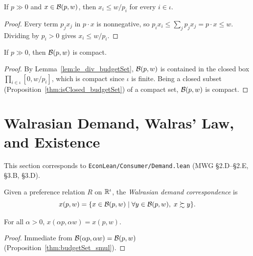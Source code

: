 \begin{lemma}
\label{lem:le_div_budgetSet}
\leanok
{}
If $p \gg 0$ and $x \in \mathcal{B}(p, w)$, then $x_i \le w / p_i$ for every $i \in \iota$.
\end{lemma}
\begin{proof}
\leanok
Every term $p_j x_j$ in $p \cdot x$ is nonnegative, so $p_i x_i \le \sum_j p_j x_j = p \cdot x \le w$.
Dividing by $p_i > 0$ gives $x_i \le w / p_i$.
\end{proof}

\begin{theorem}
\label{thm:isCompact_budgetSet}
\leanok
{}
If $p \gg 0$, then $\mathcal{B}(p, w)$ is compact.
\end{theorem}
\begin{proof}
\leanok
By Lemma~\ref{lem:le_div_budgetSet}, $\mathcal{B}(p, w)$ is contained in the closed box
$\prod_{i \in \iota} [0, w / p_i]$, which is compact since $\iota$ is finite. Being a
closed subset (Proposition~\ref{thm:isClosed_budgetSet}) of a compact set, $\mathcal{B}(p, w)$ is compact.
\end{proof}


\section{Walrasian Demand, Walras' Law, and Existence}
\label{sec:demand}

This section corresponds to \texttt{EconLean/Consumer/Demand.lean} (MWG \S2.D--\S2.E, \S3.B, \S3.D).

\begin{definition}
\label{def:demand}
\leanok
{}
Given a preference relation $R$ on $\mathbb{R}^\iota$, the \emph{Walrasian demand correspondence} is
\[
  x(p, w) = \{x \in \mathcal{B}(p, w) \mid \forall y \in \mathcal{B}(p, w),\; x \succsim y\}.
\]
\end{definition}

\begin{proposition}
\label{thm:demand_smul}
\leanok
{}
For all $\alpha > 0$, $x(\alpha p, \alpha w) = x(p, w)$.
\end{proposition}
\begin{proof}
\leanok
Immediate from $\mathcal{B}(\alpha p, \alpha w) = \mathcal{B}(p, w)$ (Proposition~\ref{thm:budgetSet_smul}).
\end{proof}

